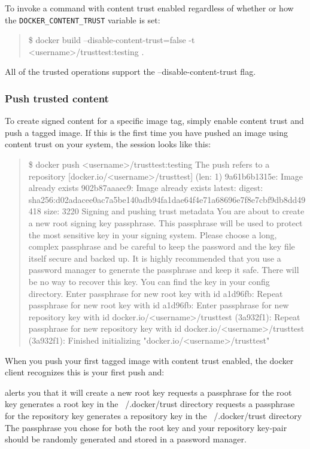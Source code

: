 To invoke a command with content trust enabled regardless of whether or how
the {\tt DOCKER\_CONTENT\_TRUST} variable is set:

\begin{quote}
\$  docker build --disable-content-trust=false -t
<username>/trusttest:testing .
\end{quote}

All of the trusted operations support the --disable-content-trust flag.

\subsubsection{Push trusted content}
To create signed content for a specific image tag, simply enable content
trust and push a tagged image. If this is the first time you have pushed an
image using content trust on your system, the session looks like this:

\begin{quote}
\$ docker push <username>/trusttest:testing
The push refers to a repository [docker.io/<username>/trusttest] (len: 1)
9a61b6b1315e: Image already exists
902b87aaaec9: Image already exists
latest: digest:
sha256:d02adacee0ac7a5be140adb94fa1dae64f4e71a68696e7f8e7cbf9db8dd49418
size: 3220
Signing and pushing trust metadata
You are about to create a new root signing key passphrase. This passphrase
will be used to protect the most sensitive key in your signing system.
Please
choose a long, complex passphrase and be careful to keep the password and
the
key file itself secure and backed up. It is highly recommended that you use
a
password manager to generate the passphrase and keep it safe. There will be
no
way to recover this key. You can find the key in your config directory.
Enter passphrase for new root key with id a1d96fb:
Repeat passphrase for new root key with id a1d96fb:
Enter passphrase for new repository key with id
docker.io/<username>/trusttest (3a932f1):
Repeat passphrase for new repository key with id
docker.io/<username>/trusttest (3a932f1):
Finished initializing "docker.io/<username>/trusttest"
\end{quote}

When you push your first tagged image with content trust enabled, the
docker client recognizes this is your first push and:

alerts you that it will create a new root key
requests a passphrase for the root key
generates a root key in the ~/.docker/trust directory
requests a passphrase for the repository key
generates a repository key in the ~/.docker/trust directory
The passphrase you chose for both the root key and your repository key-pair
should be randomly generated and stored in a password manager.

